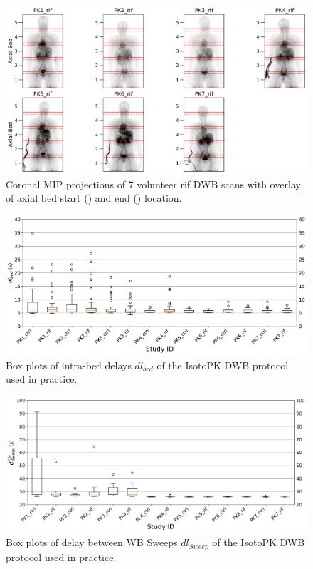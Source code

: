 \begin{figure} [ht!]
\centering
\includegraphics[scale=0.5,angle=0]{3_Results/3_1_DWB_Optimization/figures/3_1_MIPS_rif.pdf}
\caption{Coronal MIP projections of 7 volunteer rif DWB scans with overlay of axial bed start (\protect{}) and end (\protect{}) location.} 
\label{fig3_1:rif_mips}
\end{figure}
%
%
%
\begin{figure} [ht!]
\centering
\includegraphics[scale=0.5,angle=0]{3_Results/3_1_DWB_Optimization/figures/3_1_BoxPlots_DTBeds.pdf}
\caption{Box plots of intra-bed delays $dl_{bed}$ of the IsotoPK DWB protocol used in practice.} 
\label{fig3_1:BoxPlots_beds}
\end{figure}
%
\begin{figure} [ht!]
\centering
\includegraphics[scale=0.5,angle=0]{3_Results/3_1_DWB_Optimization/figures/3_1_BoxPlots_DTSweeps.pdf}
\caption{Box plots of delay between WB Sweeps $dl_{Sweep}$ of the IsotoPK DWB protocol used in practice.}
\label{fig3_1:BoxPlots_sweeps}
\end{figure}
%
%
%
